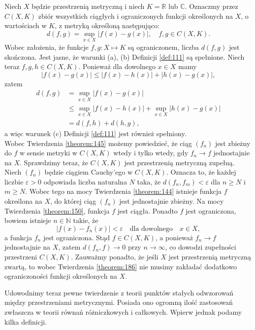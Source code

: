 \documentclass[leqno]{article}
\begin{document}
\begin{justify}
\begin{ex}
    Niech $X$ będzie przestrzenią metryczną i niech $K = \mathbb{R}$ lub $\mathbb{C}$.
    Oznaczmy przez $C(X, K)$ zbiór wszystkich ciągłych i ograniczonych funkcji określonych na $X$, o wartościach w $K$, z metryką określoną następująco:
    \[
        d(f, g) = \sup_{x \in X}|f(x) - g(x)|, \quad f, g \in C(X, K).
    \]
    Wobec założenia, że funkcje $f, g : X \mapsto K$ są ograniczonem, liczba $d(f, g)$ jest skończona.
    Jest jasne, że warunki (a), (b) Definicji \ref{def:111} są spełnione.
    Niech teraz $f, g, h \in C(X, K)$.
    Ponieważ dla dowolnego $x \in X$ mamy 
    \[
        |f(x) - g(x)| \leqslant |f(x) - h(x)| + |h(x) - g(x)|,
    \]
    zatem
    \begin{align*}
        d(f, g) &= \sup_{x \in X}|f(x) - g(x)| \\
                &\leqslant \sup_{x \in X}|f(x) - h(x)| + \sup_{x \in X}|h(x) - g(x)| \\
                &= d(f, h) + d(h, g),
    \end{align*}
    a więc warunek (c) Definicji \ref{def:111} jest również spełniony. \\
    Wobec Twierdzenia \ref{theorem:145} możemy powiedzieć, że ciąg $(f_n)$ jest zbieżny do $f$ w sensie metryki w $C(X, K)$
    wtedy i tylko wtedy, gdy $f_n \to f$ jednostajnie na $X$.
    Sprawdzimy teraz, że $C(X, K)$ jest przestrzenią metryczną zupełną. Niech $(f_n)$ będzie ciągiem Cauchy'ego w $C(X, K)$.
    Oznacza to, że każdej liczbie $\varepsilon > 0$ odpowiada liczba naturalna $N$ taka, że $d(f_n, f_m) < \varepsilon$ dla $n \geqslant N$ i $m \geqslant N$.
    Wobec tego na mocy Twierdzenia \ref{theorem:144} istnieje funkcja $f$ określona na $X$, do której ciąg $(f_n)$ jest jednostajnie zbieżny. 
    Na mocy Twierdzenia \ref{theorem:150}, funkcja $f$ jest ciągła. Ponadto $f$ jest ograniczona, bowiem istnieje
    $n \in \mathbb{N}$ takie, że 
    \[
        |f(x) - f_n(x)| < \varepsilon \quad \text{dla dowolnego} \quad x \in X,
    \] 
    a funkcja $f_n$ jest ograniczona. Stąd $f \in C(X, K)$, a ponieważ $f_n \to f$ jednostajnie na $X$,
    zatem $d(f_n, f) \to 0$ przy $n \to \infty$, co dowodzi zupełności przestrzeni $C(X, K)$.
    Zauważmy ponadto, że jeśli $X$ jest przestrzenią metryczną zwartą, to wobec Twierdzenia \ref{theorem:186}
    nie musimy zakładać dodatkowo ograniczoności funkcji określonych na $X$. 
\end{ex}

Udowodnimy teraz pewne twierdzenie z teorii punktów stałych odwzorowań między przestrzeniami metrycznymi. Posiada ono ogromną ilość zastosowań 
zwłaszcza w teorii równań różniczkowych i całkowych. Wpierw jednak podamy kilka definicji. 


\end{justify}
\end{document}
